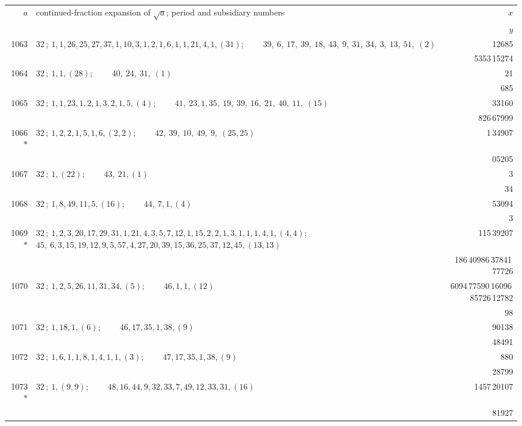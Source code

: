 \documentclass[11pt]{article}
\providecommand{\asterism}{*}
\begin{document}
\renewcommand{\arraystretch}{1.15}
\begin{longtable}{|r|p{}|r|}
\hline
$a$ & continued-fraction expansion of $\sqrt{a}$; period and subsidiary numbers & $x$ \\
 & & $y$ \\
\hline
\endhead
1063 & $32\,;\ 1, 1, 26, 25, 27, 37, 1, 10, 3, 1, 2, 1, 6, 1, 1, 21, 4, 1, (31)$; \ \ \ \ $39,\ 6,\ 17,\ 39,\ 18,\ 43,\ 9,\ 31,\ 34,\ 3,\ 13,\ 51,\ (2)$ & 12685 \\
 & & 5353\,15274 \\
\hline
1064 & $32\,;\ 1, 1, (28)$; \ \ \ \ $40,\ 24,\ 31,\ (1)$ & 21 \\
 & & 685 \\
\hline
1065 & $32\,;\ 1, 1, 23, 1, 2, 1, 3, 2, 1, 5, (4)$; \ \ \ \ $41,\ 23, 1, 35,\ 19,\ 39,\ 16,\ 21,\ 40,\ 11,\ (15)$ & 33160 \\
 & & 826\,67999 \\
\hline
1066$\asterism$ & $32\,;\ 1, 2, 2, 1, 5, 1, 6, (2, 2)$; \ \ \ \ $42,\ 39,\ 10,\ 49,\ 9,\ (25, 25)$ & 1\,34907 \\
 & & 05205 \\
\hline
1067 & $32\,;\ 1, (22)$; \ \ \ \ $43,\ 21, (1)$ & 3 \\
 & & 34 \\
\hline
1068 & $32\,;\ 1, 8, 49, 11, 5, (16)$; \ \ \ \ $44,\ 7, 1, (4)$ & 53094 \\
 & & 3 \\
\hline
1069$\asterism$ & $32\,;\ 1, 2, 3, 20, 17, 29, 31, 1, 21, 4, 3, 5, 7, 12, 1, 15, 2, 2, 1, 3, 1, 1, 1, 4, 1, (4, 4)$; \ \ \ \ $45,\ 6, 3, 15, 19, 12, 9, 5, 57, 4, 27, 20, 39, 15, 36, 25, 37, 12, 45, (13, 13)$ & 115\,39207 \\
 & & 186\,40986\,37841\,77726 \\
\hline
1070 & $32\,;\ 1, 2, 5, 26, 11, 31, 34, (5)$; \ \ \ \ $46, 1, 1, (12)$ & 6094\,77590\,16096\,85726\,12782 \\
 & & 98 \\
\hline
1071 & $32\,;\ 1, 18, 1, (6)$; \ \ \ \ $46, 17, 35, 1, 38, (9)$ & 90138 \\
 & & 48491 \\
\hline
1072 & $32\,;\ 1, 6, 1, 1, 8, 1, 4, 1, 1, (3)$; \ \ \ \ $47, 17, 35, 1, 38, (9)$ & 880 \\
 & & 28799 \\
\hline
1073$\asterism$ & $32\,;\ 1, (9, 9)$; \ \ \ \ $48, 16, 44, 9, 32, 33, 7, 49, 12, 33, 31, (16)$ & 1457\,20107 \\
 & & 81927 \\

\end{longtable}
\end{document}
